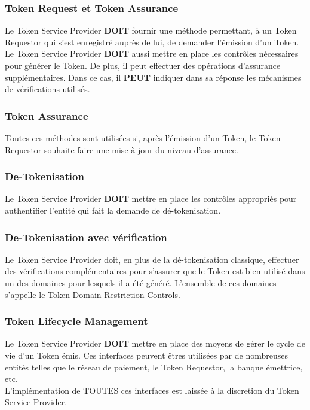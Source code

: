 \documentclass{report}
\begin{document}
\subsubsection{Token Request et Token Assurance}
Le Token Service Provider \textbf{DOIT} fournir une méthode permettant, à un Token Requestor qui s'est enregistré auprès de lui, de demander l'émission d'un Token.
Le Token Service Provider \textbf{DOIT} aussi mettre en place les contrôles nécessaires pour générer le Token. De plus, il peut effectuer des opérations d'assurance supplémentaires. Dans ce cas, il \textbf{PEUT} indiquer dans sa réponse les mécanismes de vérifications utilisés. 

\subsubsection{Token Assurance}
Toutes ces méthodes sont utilisées si, après l'émission d'un Token, le Token Requestor souhaite faire une mise-à-jour du niveau d'assurance.

\subsubsection{De-Tokenisation}
Le Token Service Provider \textbf{DOIT} mettre en place les contrôles appropriés pour authentifier l'entité qui fait la demande de dé-tokenisation.

\subsubsection{De-Tokenisation avec vérification}
Le Token Service Provider doit, en plus de la dé-tokenisation classique, effectuer des vérifications complémentaires pour s'assurer que le Token est bien utilisé dans un des domaines pour lesquels il a été généré. L'ensemble de ces domaines s'appelle le Token Domain Restriction Controls. 

\subsubsection{Token Lifecycle Management}
Le Token Service Provider \textbf{DOIT} mettre en place des moyens de gérer le cycle de vie d'un Token émis. Ces interfaces peuvent êtres utilisées par de nombreuses entités telles que le réseau de paiement, le Token Requestor, la banque émettrice, etc.\\

\noindent
L'implémentation de TOUTES ces interfaces est laissée à la discretion du Token Service Provider.
\end{document}
